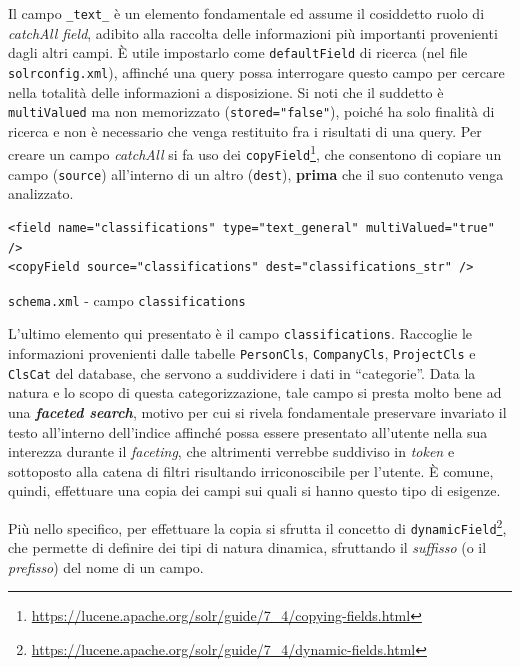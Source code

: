 Il campo \texttt{\_text\_} è un elemento fondamentale ed assume il cosiddetto ruolo di \textit{catchAll field}, adibito alla raccolta delle informazioni più importanti provenienti dagli altri campi. È utile impostarlo come \texttt{defaultField} di ricerca (nel file \texttt{solrconfig.xml}), affinché una query possa interrogare questo campo per cercare nella totalità delle informazioni a disposizione. Si noti che il suddetto è \texttt{multiValued} ma non memorizzato (\texttt{stored="false"}), poiché ha solo finalità di ricerca e non è necessario che venga restituito fra i risultati di una query. Per creare un campo \textit{catchAll} si fa uso dei \texttt{copyField}\footnote{\url{https://lucene.apache.org/solr/guide/7_4/copying-fields.html}}, che consentono di copiare un campo (\texttt{source}) all’interno di un altro (\texttt{dest}), \textbf{prima} che il suo contenuto venga analizzato.

\vspace{1.8em}
\begin{listing}[H]
\begin{verbatim}
<field name="classifications" type="text_general" multiValued="true" />
<copyField source="classifications" dest="classifications_str" />
\end{verbatim}
\caption{\texttt{schema.xml} - campo \texttt{classifications}}
\label{code:schema1field4}
\end{listing}
\vspace{-1em}

L’ultimo elemento qui presentato è il campo \texttt{classifications}. Raccoglie le informazioni provenienti dalle tabelle \texttt{PersonCls}, \texttt{CompanyCls}, \texttt{ProjectCls} e \texttt{ClsCat} del database, che servono a suddividere i dati in “categorie”. Data la natura e lo scopo di questa categorizzazione, tale campo si presta molto bene ad una \textbf{\textit{faceted search}}, motivo per cui si rivela fondamentale preservare invariato il testo all’interno dell’indice affinché possa essere presentato all’utente nella sua interezza durante il \textit{faceting}, che altrimenti verrebbe suddiviso in \textit{token} e sottoposto alla catena di filtri risultando irriconoscibile per l’utente. È comune, quindi, effettuare una copia dei campi sui quali si hanno questo tipo di esigenze.

\vspace{1em}

Più nello specifico, per effettuare la copia si sfrutta il concetto di \texttt{dynamicField}\footnote{\url{https://lucene.apache.org/solr/guide/7_4/dynamic-fields.html}}, che permette di definire dei tipi di natura dinamica, sfruttando il \textit{suffisso} (o il \textit{prefisso}) del nome di un campo.

